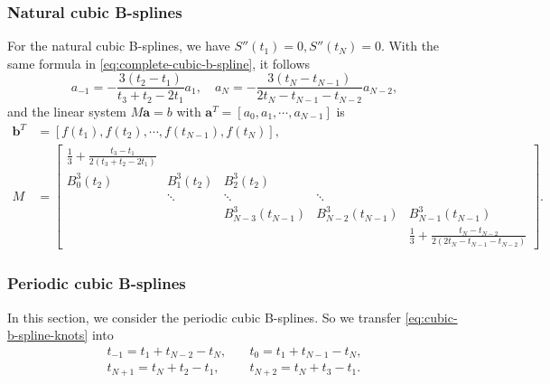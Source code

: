 \documentclass[a4paper]{article}
\theoremstyle{definition}
\begin{document}
\subsubsection{Natural cubic B-splines}
\label{sec:natural-cubic-b-splines}

For the natural cubic B-splines, we have $S''(t_1) = 0, S''(t_N) = 0$. With the same formula in \cref{eq:complete-cubic-b-spline}, it follows 
\begin{equation}
  a_{-1} = -\frac{3(t_2 - t_1)}{t_3 + t_2 - 2t_1} a_1,\quad a_N = -\frac{3(t_N - t_{N - 1})}{2t_N - t_{N - 1} - t_{N - 2}}a_{N - 2},
  \label{eq:natural-cubic-b-spline-coefficients}
\end{equation}
and the linear system $M\mathbf{a} = b$ with $\mathbf{a}^T = [a_0, a_1, \cdots, a_{N - 1}]$ is 
\begin{equation}
  \begin{aligned}
    \mathbf{b}^T &= [f(t_1), f(t_2), \cdots, f(t_{N - 1}), f(t_N)], \\
    M &= \begin{bmatrix}
      \frac{1}{3} + \frac{t_3 - t_1}{2(t_3 + t_2 - 2t_1)} &    &    &    &    \\
      B_0^3(t_2) & B_1^3(t_2) & B_2^3(t_2) &    &    \\
        & \ddots & \ddots & \ddots &    \\
        &    & B_{N - 3}^3(t_{N - 1}) & B_{N - 2}^3(t_{N - 1}) & B_{N - 1}^3(t_{N - 1}) \\
        &    &    &    & \frac{1}{3} + \frac{t_N - t_{N - 2}}{2(2t_N - t_{N - 1} - t_{N - 2})}
    \end{bmatrix}.
  \end{aligned}
  \label{eq:natural-cubic-b-spline-linear-system}
\end{equation}

\subsubsection{Periodic cubic B-splines}

In this section, we consider the periodic cubic B-splines. So we transfer \cref{eq:cubic-b-spline-knots} into 
\begin{equation}
  \begin{aligned}
    t_{-1} = t_1 + t_{N - 2} - t_N,\quad & t_0 = t_1 + t_{N - 1} - t_N, \\
    t_{N + 1} = t_N + t_2 - t_1,\quad & t_{N + 2} = t_N + t_3 - t_1.
  \end{aligned}
  \label{eq:periodic-cubic-b-spline-knots}
\end{equation}
\end{document}
